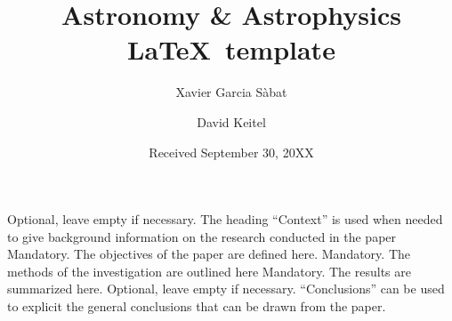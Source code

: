 \documentclass{aa}
\begin{document}
   \title{Astronomy \& Astrophysics \LaTeX\ template}


%
%
%

   \author{Xavier Garcia Sàbat        %
        \and David Keitel
        }


   \date{Received September 30, 20XX}

 
  \abstract
   {Optional, leave empty if necessary.  The heading “Context” is used when needed to
give background information on the research conducted in the paper}
   {Mandatory. The objectives of the paper are defined here.} 
   {Mandatory. The methods of the investigation are outlined here}
   {Mandatory. The results are summarized here.}
   {Optional, leave empty if necessary.  “Conclusions” can be used to
explicit the general conclusions that can be drawn from the paper.}


   \maketitle
\end{document}
